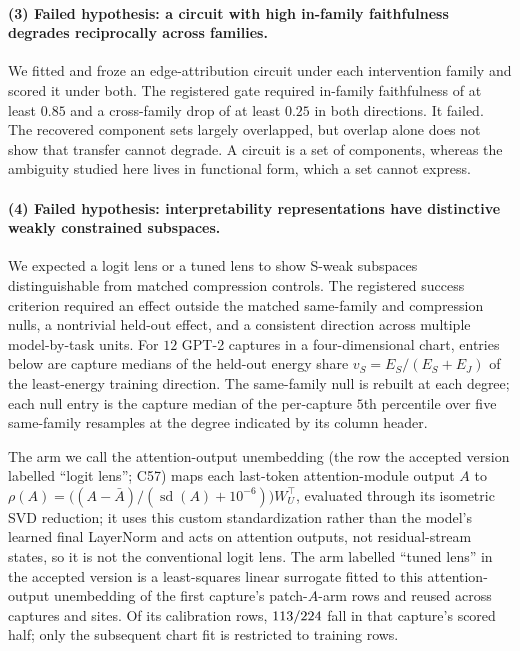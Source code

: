 \paragraph{(3) Failed hypothesis: a circuit with high in-family faithfulness degrades reciprocally across families.} We fitted and froze
an edge-attribution circuit under each intervention family and scored it under both. The registered gate required
in-family faithfulness of at least $0.85$ and a cross-family drop of at least $0.25$ in both directions. It failed.
The recovered component sets largely overlapped, but overlap alone does not show that transfer cannot degrade. A
circuit is a set of components, whereas the ambiguity studied here lives in functional form, which a set cannot
express.

\paragraph{(4) Failed hypothesis: interpretability representations have distinctive weakly constrained subspaces.} We expected a logit
lens or a tuned lens to show S-weak subspaces distinguishable from matched compression controls. The registered success criterion required an effect outside the matched same-family and
compression nulls, a nontrivial held-out effect, and a consistent direction across multiple model-by-task units.
For $12$ GPT-2 captures in a four-dimensional chart, entries below are capture medians of the held-out energy share
$v_S=E_S/(E_S+E_J)$ of the least-energy training direction. The same-family null is rebuilt at each degree; each null
entry is the capture median of the per-capture $5$th percentile over five same-family resamples at the degree
indicated by its column header.

The arm we call the attention-output unembedding (the row the accepted version labelled ``logit lens''; C57) maps each
last-token attention-module output $A$ to $\rho(A)=\bigl((A-\bar A)/(\operatorname{sd}(A)+10^{-6})\bigr)W_U^{\top}$,
evaluated through its isometric SVD reduction; it uses this custom standardization rather than the model's learned final
LayerNorm and acts on attention outputs, not residual-stream states, so it is not the conventional logit lens. The arm
labelled ``tuned lens'' in the accepted version is a least-squares linear surrogate fitted to this attention-output
unembedding of the first capture's patch-$A$-arm rows and reused across captures and
sites. Of its calibration rows, $113/224$ fall in that capture's scored half; only the subsequent chart
fit is restricted to training rows.

